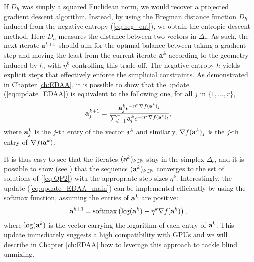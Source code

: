 If $D_h$ was simply a squared Euclidean norm, we would recover a projected gradient descent algorithm. 
Instead, by using the Bregman distance function $D_h$ induced from the negative entropy (\ref{eq:neg_ent}), we obtain the entropic descent method.
Here $D_h$ measures the distance between two vectors in $\Delta_r$.
As such, the next iterate $\mathbf a^{k+1}$ should aim for the optimal balance between taking a gradient step and moving the least from the current iterate $\mathbf a^k$ according to the geometry induced by $h$, with $\eta^k$ controlling this trade-off.
The negative entropy $h$ yields explicit steps that effectively enforce the simplicial constraints.
As demonstrated in Chapter \ref{ch:EDAA}, it is possible to show that the update (\ref{eq:update_EDAA}) is equivalent to the following one, for all $j$ in $\{1, \ldots, r\}$,
\begin{equation}
    \label{eq:update_EDAA_main}
    \mathbf a_j^{k+1} = \frac{\mathbf a_j^k e^{-\eta^k \nabla f (\mathbf a^k)_j}}{\sum_{l=1}^r \mathbf a_l^k e^{-\eta^k \nabla f (\mathbf a^k)_l}},
\end{equation}
where $\mathbf a_j^k$ is the $j$-th entry of the vector $\mathbf a^k$ and similarly, $\nabla f(\mathbf a^k)_j$ is the $j$-th entry of $\nabla f(\mathbf a^k)$.

It is thus easy to see that the iterates $(\mathbf a^k)_{k \in \mathbb{N}}$ stay in the simplex $\Delta_r$, and it is possible to show (see \cite{beck_mirror_2003}) that the sequence $(\mathbf a^k)_{k \in \mathbb{N}}$ converges to the set of solutions of (\ref{eq:QP2}) with the appropriate step sizes $\eta^k$.
Interestingly, the update (\ref{eq:update_EDAA_main}) can be implemented efficiently by using the softmax function, assuming the entries of $\mathbf a^k$ are positive:
\begin{equation}
    \label{eq:update_EDAA_softmax}
    \mathbf a^{k+1} = \text{softmax} \left( \text{log}(\mathbf a^k) - \eta^k \nabla f (\mathbf a^k)\right),
\end{equation}
where $\text{log}(\mathbf a^k)$ is the vector carrying the logarithm of each entry of $\mathbf a^k$.
This update immediately suggests a high compatibility with GPUs and we will describe in Chapter \ref{ch:EDAA} how to leverage this approach to tackle blind unmixing.